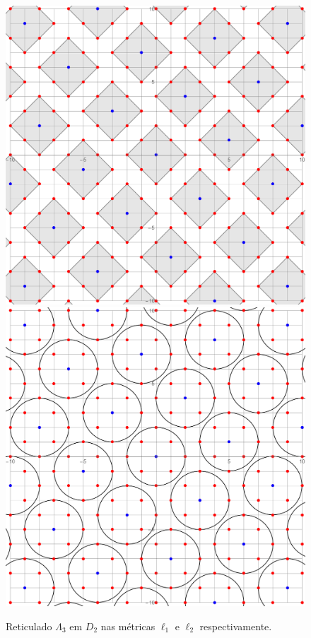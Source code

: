 \documentclass{article}
\theoremstyle{plain}
\theoremstyle{definition}
\theoremstyle{remark}
\begin{document}
\begin{figure}[!ht]
  \centering
  \includegraphics[scale=0.2]{newcoder2l1.pdf}\;\;\;\;\includegraphics[scale=0.2]{newcoder2l2.pdf}
  \caption{Reticulado $\Lambda_3$ em $D_2$ nas métricas $\ell_1$ e $\ell_2$ respectivamente.}
\end{figure}
\end{document}

